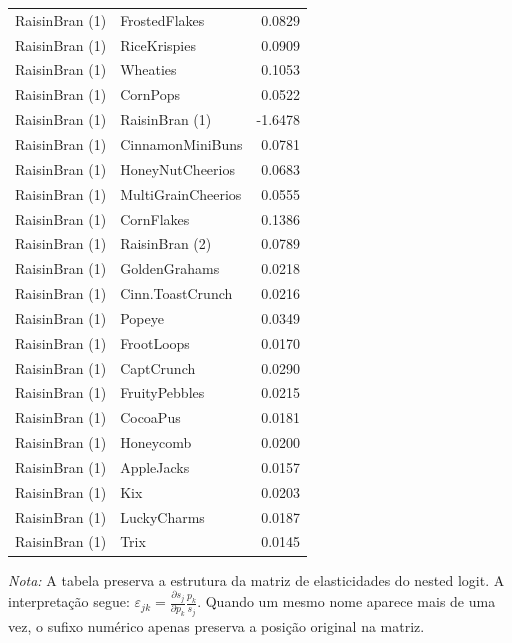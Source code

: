 \begin{table}[H]
\begin{tabular}{llr}
RaisinBran (1) & FrostedFlakes & 0.0829 \\
RaisinBran (1) & RiceKrispies & 0.0909 \\
RaisinBran (1) & Wheaties & 0.1053 \\
RaisinBran (1) & CornPops & 0.0522 \\
RaisinBran (1) & RaisinBran (1) & -1.6478 \\
RaisinBran (1) & CinnamonMiniBuns & 0.0781 \\
RaisinBran (1) & HoneyNutCheerios & 0.0683 \\
RaisinBran (1) & MultiGrainCheerios & 0.0555 \\
RaisinBran (1) & CornFlakes & 0.1386 \\
RaisinBran (1) & RaisinBran (2) & 0.0789 \\
RaisinBran (1) & GoldenGrahams & 0.0218 \\
RaisinBran (1) & Cinn.ToastCrunch & 0.0216 \\
RaisinBran (1) & Popeye & 0.0349 \\
RaisinBran (1) & FrootLoops & 0.0170 \\
RaisinBran (1) & CaptCrunch & 0.0290 \\
RaisinBran (1) & FruityPebbles & 0.0215 \\
RaisinBran (1) & CocoaPus & 0.0181 \\
RaisinBran (1) & Honeycomb & 0.0200 \\
RaisinBran (1) & AppleJacks & 0.0157 \\
RaisinBran (1) & Kix & 0.0203 \\
RaisinBran (1) & LuckyCharms & 0.0187 \\
RaisinBran (1) & Trix & 0.0145 \\
\bottomrule
\end{tabular}

\vspace{0.3em}
\footnotesize
\textit{Nota:} A tabela preserva a estrutura da matriz de elasticidades do nested logit. A interpretação segue: $\varepsilon_{jk}=\frac{\partial s_j}{\partial p_k}\frac{p_k}{s_j}$. Quando um mesmo nome aparece mais de uma vez, o sufixo numérico apenas preserva a posição original na matriz.
\end{table}
\endgroup


